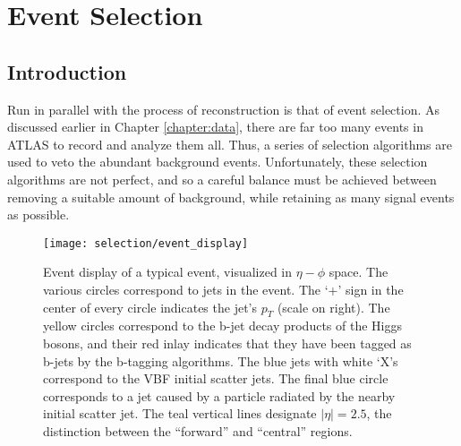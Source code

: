 \chapter{Event Selection} \label{chapter:selection}

\section{Introduction}

    Run in parallel with the process of reconstruction is that of event selection.
    As discussed earlier in Chapter \ref{chapter:data},
        there are far too many events in ATLAS to record and analyze them all.
    Thus, a series of selection algorithms are used to veto the abundant background events.
    Unfortunately, these selection algorithms are not perfect,
        and so a careful balance must be achieved between removing a suitable amount of background,
        while retaining as many signal events as possible.

    \begin{figure}[tbh]
        \texttt{[image: selection/event\_display]}
        \caption{
            Event display of a typical \vbfproc event, visualized in $\eta-\phi$ space.
            The various circles correspond to jets in the event.
            The `+' sign in the center of every circle indicates the jet's $p_T$ (scale on right).
            The yellow circles correspond to the b-jet decay products of the Higgs bosons,
                and their red inlay indicates that they have been tagged as b-jets by the b-tagging algorithms.
            The blue jets with white `X's correspond to the VBF initial scatter jets.
            The final blue circle corresponds to a jet caused by a particle radiated by the nearby initial scatter jet.
            The teal vertical lines designate $|\eta|=2.5$,
                the distinction between the ``forward'' and ``central'' regions.
        }
        \label{fig:event_display}
    \end{figure}

